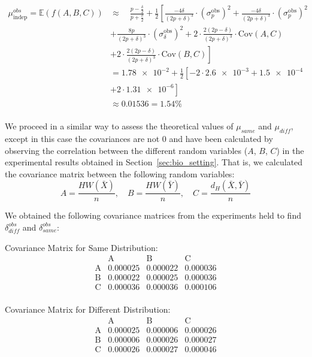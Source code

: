 \begin{equation}
    \begin{aligned}
    \mu_{\text{indep}}^{obs} = \mathbb{E}(f(A,B,C)) &\approx \quad \frac{p - \frac{\delta}{2}}{p + \frac{\delta}{2}} + \frac{1}{2} \left[ \frac{-4\delta}{(2p + \delta)^3}\cdot({\sigma^\text{obs}_p})^2 + \frac{-4\delta}{(2p + \delta)^3}\cdot({\sigma^\text{obs}_p})^2 \right. \\[2mm]
    & \left. + \frac{8p}{(2p + \delta)^3}\cdot({\sigma^\text{obs}_\delta})^2 + 2\cdot\frac{2(2p - \delta)}{(2p + \delta)^3}\cdot\text{Cov}(A,C) \right. \\[2mm]
    & \left. + 2\cdot\frac{2(2p - \delta)}{(2p + \delta)^3}\cdot\text{Cov}(B,C) \right]\\[10mm]
    & = \num{1.78e-2} + \frac{1}{2} \left[ -2\cdot\num{2.6e-3} + \num{1.5e-4}  \right. \\[2mm]
    & \left. + 2\cdot\num{1.31e-6} \right] \\[10mm]
    & \approx 0.01536 = 1.54\%
    \end{aligned}
    \label{eq:mu_indep}
\end{equation}\\

We proceed in a similar way to assess the theoretical values of $\mu_{same}$ and $\mu_{diff}$, except in this case the covariances are not \(0\) and have been calculated by observing the correlation between the different random variables (\(A\), \(B\), \(C\)) in the experimental results obtained in Section~\ref{sec:bio_setting}. That is, we calculated the covariance matrix between the following random variables:
\[
A = \frac{HW(\bar{X})}{n}, \quad B = \frac{HW(\bar{Y})}{n}, \quad C = \frac{d_H(\bar{X}, \bar{Y})}{n}
\]

We obtained the following covariance matrices from the experiments held to find \(\delta^{obs}_{diff}\) and \(\delta^{obs}_{same}\):

Covariance Matrix for Same Distribution:
\[
\begin{array}{c|ccc}
           & \text{A} & \text{B} & \text{C} \\
\hline
\text{A} & 0.000025 & 0.000022 & 0.000036 \\
\text{B} & 0.000022 & 0.000025 & 0.000036 \\
\text{C}  & 0.000036 & 0.000036 & 0.000106 \\
\end{array}
\]

Covariance Matrix for Different Distribution:
\[
\begin{array}{c|ccc}
           & \text{A} & \text{B} & \text{C} \\
\hline
\text{A} & 0.000025 & 0.000006 & 0.000026 \\
\text{B} & 0.000006 & 0.000026 & 0.000027 \\
\text{C}  & 0.000026 & 0.000027 & 0.000046 \\
\end{array}
\]\\



